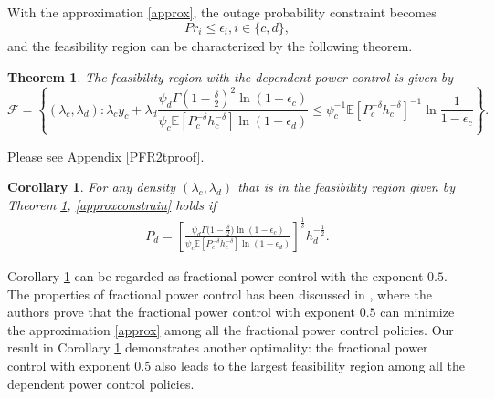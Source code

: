 \documentclass[12pt, draftclsnofoot, journal, letterpaper, onecolumn]{IEEEtran}
\newtheorem{corollary}{Corollary}[section]
\newtheorem{theorem}{Theorem}[section]
\begin{document}
With the approximation \eqref{approx}, the outage probability constraint becomes
\begin{equation}\label{approxconstrain}
\underline{Pr_i}\leq\epsilon_i,i\in\{c,d\},
\end{equation}
and the feasibility region can be characterized by the following theorem.
\begin{theorem}\label{PFR2t}
The feasibility region with the dependent power control is given by
\begin{equation}
\mathcal F=\left\{(\lambda_c,\lambda_d):\lambda_cy_c+\lambda_d\frac{\psi_d\Gamma(1-\frac{\delta}{2})^2
\ln(1-\epsilon_c)}{\psi_c\mathbb{E}[P_c^{-\delta}h_c^{-\delta}]\ln(1-\epsilon_d)}\leq\psi_c^{-1}
\mathbb{E}[P_c^{-\delta}h_c^{-\delta}]^{-1}\ln\frac{1}{1-\epsilon_c}\right\}.
\end{equation}
\end{theorem}

\begin{IEEEproof}
  Please see Appendix \ref{PFR2tproof}.
\end{IEEEproof}


\begin{corollary}\label{PFR2tC}
For any density $(\lambda_c,\lambda_d)$ that is in the feasibility region given by Theorem \ref{PFR2t}, \eqref{approxconstrain} holds if
\begin{eqnarray*}
P_d=\left[\frac{\psi_d\Gamma{(1-\frac{\delta}{2}})\ln(1-\epsilon_c)}{\psi_c\mathbb{E}
[P_c^{-\delta}h_c^{-\delta}]\ln(1-\epsilon_d)}\right]^{\frac{1}{\delta}}h_d^{-\frac{1}{2}}.
\end{eqnarray*}
\end{corollary}

Corollary \ref{PFR2tC} can be regarded as fractional power control with the exponent $0.5$. The properties of fractional power control has been discussed in \cite{FPC},  where the authors  prove that the fractional power control with exponent $0.5$ can minimize the approximation \eqref{approx} among all the fractional power control policies. Our result in Corollary \ref{PFR2tC} demonstrates another optimality: the fractional power control with exponent $0.5$ also leads to the largest feasibility region among all the dependent power control policies.
\end{document}

